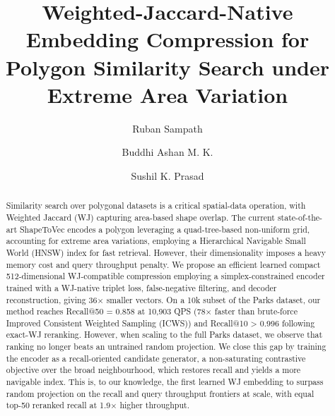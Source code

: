 \documentclass[sigconf]{acmart}
\begin{document}
\title{Weighted-Jaccard-Native Embedding Compression for Polygon Similarity Search under Extreme Area Variation}

\author{Ruban Sampath}

\author{Buddhi Ashan M. K.}

\author{Sushil K. Prasad}

\renewcommand{\shortauthors}{Sampath et al.}

\begin{abstract}
Similarity search over polygonal datasets is a critical spatial-data operation, with Weighted Jaccard (WJ) capturing area-based shape overlap. The current state-of-the-art ShapeToVec encodes a polygon leveraging a quad-tree-based non-uniform grid, accounting for extreme area variations, employing a Hierarchical Navigable Small World (HNSW) index for fast retrieval. However, their dimensionality imposes a heavy memory cost and query throughput penalty. We propose an efficient learned compact 512-dimensional WJ-compatible compression employing a simplex-constrained encoder trained with a WJ-native triplet loss, false-negative filtering, and decoder reconstruction, giving 36× smaller vectors.
On a 10k subset of the Parks dataset, our method reaches Recall@50 = 0.858 at 10,903 QPS (78× faster than brute-force Improved Consistent Weighted Sampling (ICWS)) and Recall@10 > 0.996 following exact-WJ reranking. However, when scaling to the full Parks dataset, we observe that ranking no longer beats an untrained random projection. We close this gap by training the encoder as a recall-oriented candidate generator, a non-saturating contrastive objective over the broad neighbourhood, which restores recall and yields a more navigable index. This is, to our knowledge, the first learned WJ embedding to surpass random projection on the recall and query throughput frontiers at scale, with equal top-50 reranked recall at 1.9× higher throughput.

\end{abstract}
\end{document}
